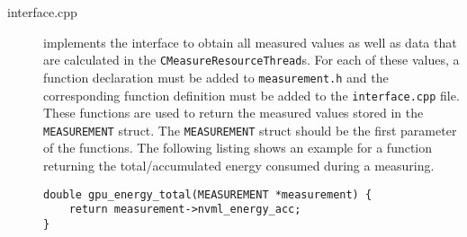 \begin{description}
\item[interface.cpp] implements the interface to obtain all measured values as well as data that are calculated in the \texttt{CMeasureResourceThread}s. For each of these values, a function declaration must be added to \texttt{measurement.h} and the corresponding function definition must be added to the \texttt{interface.cpp} file. These functions are used to return the measured values stored in the \texttt{MEASUREMENT} struct. The \texttt{MEASUREMENT} struct should be the first parameter of the functions. The following listing shows an example for a function returning the total/accumulated energy consumed during a measuring.
\begin{lstlisting}[caption={Example for a function to return values stored in a \texttt{MEASUREMENT} struct.}, label=lst:GPUEnergyExample]
double gpu_energy_total(MEASUREMENT *measurement) {
	return measurement->nvml_energy_acc;
}
\end{lstlisting}


\end{description}

